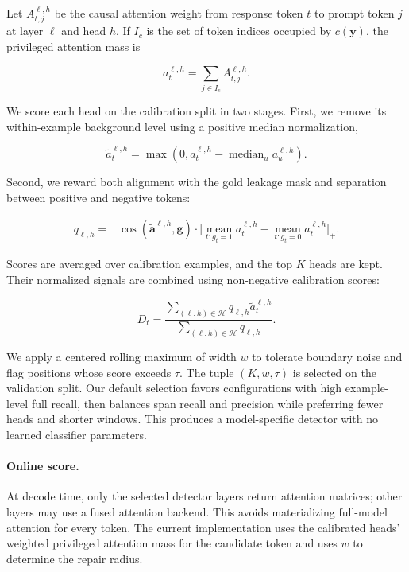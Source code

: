 \documentclass[11pt]{article}
\newcommand{\by}{\mathbf{y}}
\begin{document}
Let $A^{\ell,h}_{t,j}$ be the causal attention weight from response token $t$ to
prompt token $j$ at layer $\ell$ and head $h$.  If $I_c$ is the set of token
indices occupied by $c(\by)$, the privileged attention mass is

\begin{equation}
  a^{\ell,h}_t = \sum_{j\in I_c} A^{\ell,h}_{t,j}.
  \label{eq:attention-mass}
\end{equation}

We score each head on the calibration split in two stages.  First, we remove its
within-example background level using a positive median normalization,

\begin{equation}
  \widetilde{a}^{\ell,h}_t =
  \max\!\left(0,
  a^{\ell,h}_t-\operatorname{median}_{u}a^{\ell,h}_u\right).
\end{equation}

Second, we reward both alignment with the gold leakage mask and separation
between positive and negative tokens:

\begin{align}
q_{\ell,h} ={}&
  \cos\!\left(\widetilde{\mathbf{a}}^{\ell,h},\mathbf{g}\right)
  \cdot
  \Bigg[
  \underset{t:g_t=1}{\operatorname{mean}} a^{\ell,h}_t
  -\underset{t:g_t=0}{\operatorname{mean}} a^{\ell,h}_t
  \Bigg]_+ .
\label{eq:head-score}
\end{align}

Scores are averaged over calibration examples, and the top $K$ heads are kept.
Their normalized signals are combined using non-negative calibration scores:

\begin{equation}
  D_t = \frac{\sum_{(\ell,h)\in\mathcal{H}}
  q_{\ell,h}\widetilde{a}^{\ell,h}_t}
  {\sum_{(\ell,h)\in\mathcal{H}}q_{\ell,h}}.
  \label{eq:aggregate}
\end{equation}

We apply a centered rolling maximum of width $w$ to tolerate boundary noise and
flag positions whose score exceeds $\tau$.  The tuple $(K,w,\tau)$ is selected
on the validation split.  Our default selection favors configurations with high
example-level full recall, then balances span recall and precision while
preferring fewer heads and shorter windows.  This produces a model-specific
detector with no learned classifier parameters.

\paragraph{Online score.}
At decode time, only the selected detector layers return attention matrices;
other layers may use a fused attention backend.  This avoids materializing
full-model attention for every token.  The current implementation uses the
calibrated heads' weighted privileged attention mass for the candidate token and
uses $w$ to determine the repair radius.
\end{document}

